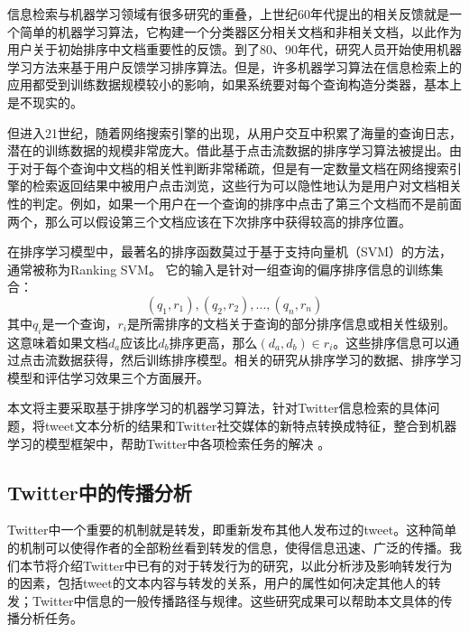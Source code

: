 信息检索与机器学习领域有很多研究的重叠，上世纪60年代提出的相关反馈就是一个简单的机器学习算法，它构建一个分类器区分相关文档和非相关文档，以此作为用户关于初始排序中文档重要性的反馈。到了80、90年代，研究人员开始使用机器学习方法来基于用户反馈学习排序算法。但是，许多机器学习算法在信息检索上的应用都受到训练数据规模较小的影响，如果系统要对每个查询构造分类器，基本上是不现实的。

但进入21世纪，随着网络搜索引擎的出现，从用户交互中积累了海量的查询日志，潜在的训练数据的规模非常庞大。借此基于点击流数据的排序学习算法被提出。由于对于每个查询中文档的相关性判断非常稀疏，但是有一定数量文档在网络搜索引擎的检索返回结果中被用户点击浏览，这些行为可以隐性地认为是用户对文档相关性的判定。例如，如果一个用户在一个查询的排序中点击了第三个文档而不是前面两个，那么可以假设第三个文档应该在下次排序中获得较高的排序位置。

在排序学习模型中，最著名的排序函数莫过于基于支持向量机（SVM）的方法，通常被称为Ranking SVM。 它的输入是针对一组查询的偏序排序信息的训练集合：
$$(q_1,r_1),(q_2,r_2),...,(q_n,r_n)$$
其中$q_i$是一个查询，$r_i$是所需排序的文档关于查询的部分排序信息或相关性级别。这意味着如果文档$d_a$应该比$d_b$排序更高，那么$(d_a,d_b)\in r_i$。这些排序信息可以通过点击流数据获得，然后训练排序模型。相关的研究从排序学习的数据、排序学习模型和评估学习效果三个方面展开。

本文将主要采取基于排序学习的机器学习算法，针对Twitter信息检索的具体问题，将tweet文本分析的结果和Twitter社交媒体的新特点转换成特征，整合到机器学习的模型框架中，帮助Twitter中各项检索任务的解决 。

\subsection{Twitter中的传播分析}
\label{rel3}
Twitter中一个重要的机制就是转发，即重新发布其他人发布过的tweet。这种简单的机制可以使得作者的全部粉丝看到转发的信息，使得信息迅速、广泛的传播。我们本节将介绍Twitter中已有的对于转发行为的研究，以此分析涉及影响转发行为的因素，包括tweet的文本内容与转发的关系，用户的属性如何决定其他人的转发；Twitter中信息的一般传播路径与规律。这些研究成果可以帮助本文具体的传播分析任务。

